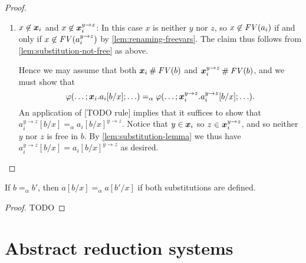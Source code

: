 \documentclass[a4paper, 11pt, article, danish, oneside]{memoir}
\DeclarePairedDelimiter{\auxdelimparen}{(}{)}
\renewcommand{\phi}{\varphi}
\newcommand{\freevar}[2][]{\mathit{FV}\auxdelimparen[#1]{#2}}
\begin{document}
\begin{proof}
\begin{proofsec}
\begin{enumerate}
            \item $x \not\in \bm{x}_i$ and $x \not\in \bm{x}_i^{y \to z}$: In this case $x$ is neither $y$ nor $z$, so $x \not\in \freevar{a_i}$ if and only if $x \not\in \freevar{a_i^{y \to z}}$ by \cref{lem:renaming-freevars}. The claim thus follows from \cref{lem:substitution-not-free} as above.

            Hence we may assume that both $\seq{x}_i \disj \freevar{b}$ and $\seq{x}_i^{y \to z} \disj \freevar{b}$, and we must show that
            \begin{equation*}
                \phi(\ldots ; \seq{x}_i.a_i[b/x] ; \ldots)
                    =_\alpha \phi( \ldots ; \seq{x}_i^{y \to z}.a_i^{y \to z}[b/x] ; \ldots ).
            \end{equation*}
            An application of [TODO rule] implies that it suffices to show that $a_i^{y \to z}[b/x] =_\alpha a_i[b/x]^{y \to z}$. Notice that $y \in \bm{x}_i$ so $z \in \bm{x}_i^{y \to z}$, and so neither $y$ nor $z$ is free in $b$. By \cref{lem:substitution-lemma} we thus have $a_i^{y \to z}[b/x] = a_i[b/x]^{y \to z}$ as desired.
        \end{enumerate}
    \end{proofsec}
\end{proof}


\begin{lemma}
    \label{lem:substitution-alpha-2}
    If $b =_\alpha b'$, then $a[b/x] =_\alpha a[b'/x]$ if both substitutions are defined.
\end{lemma}

\begin{proof}
    TODO
\end{proof}


\section{Abstract reduction systems}

\newcommand{\reduce}{\rightarrow}
\newcommand{\reduceR}{\overset{=}{\rightarrow}}
\newcommand{\reduceT}{\overset{+}{\rightarrow}}
\newcommand{\reduceRT}{\overset{*}{\rightarrow}}
\newcommand{\reduceI}{\leftarrow}
\newcommand{\reduceIR}{\overset{=}{\leftarrow}}
\newcommand{\reduceIT}{\overset{+}{\leftarrow}}
\newcommand{\reduceIRT}{\overset{*}{\leftarrow}}
\newcommand{\reduceS}{\leftrightarrow}
\newcommand{\reduceTS}{\overset{+}{\leftrightarrow}}
\newcommand{\reduceRTS}{\overset{*}{\leftrightarrow}}
\newcommand{\joinable}{\downarrow}
\end{document}
